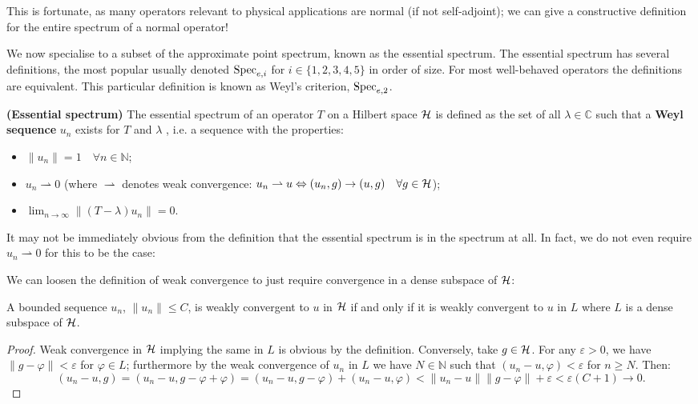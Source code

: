 \documentclass[../main.tex]{subfiles}
\begin{document}
This is fortunate, as many operators relevant to physical applications are normal (if not self-adjoint); we can give a constructive definition for the entire spectrum of a normal operator! 

We now specialise to a subset of the approximate point spectrum, known as the essential spectrum.
The essential spectrum has several definitions, 
the most popular usually denoted $\mathrm{Spec}_{e,i}$ for $i \in \{1,2,3,4,5\}$ in order of size. For 
most well-behaved operators the definitions are equivalent. This particular definition 
is known as Weyl's criterion, $\mathrm{Spec}_{e, 2}$. \cite{edmunds2018spectral}

\begin{definition}{\textbf{(Essential spectrum)}}
The essential spectrum of an operator $T$ on a Hilbert space $\mathcal{H}$ 
is defined as the set of all $\lambda \in \mathbb{C}$ such that a \textbf{Weyl sequence} $u_n$ exists for $T$ and $\lambda$ , i.e. a sequence with the properties:
\begin{itemize}
\item $\|u_n\| = 1\quad \forall n \in \mathbb{N}$;
\item $u_n \rightharpoonup 0$ (where $\rightharpoonup$ denotes weak convergence: $u_n \rightharpoonup u \Leftrightarrow (u_n, g) \rightarrow (u, g) \quad \forall g \in \mathcal{H}$);
\item $\lim_{n \rightarrow \infty}\|(T - \lambda)u_n\|  = 0$.
\end{itemize}
\end{definition}

It may not be immediately obvious from the definition that the essential spectrum is in the spectrum at all. In fact, we do not even require $u_n \rightharpoonup 0$ for this to be the case:



We can loosen the definition of weak convergence to just require convergence in a dense subspace of $\mathcal{H}$:
\begin{lemma}\label{thm:weak-conv-dense-subset}
A bounded sequence $u_n$, $\|u_n\| \leq C$, is weakly convergent to $u$ in $\mathcal{H}$ if and only if it is weakly convergent to $u$ in $L$ where $L$ is a dense subspace of $\mathcal{H}$.
\end{lemma}
\begin{proof}
Weak convergence in $\mathcal{H}$ implying the same in $L$ is obvious by the definition. 
Conversely, take $g \in \mathcal{H}$. For any $\varepsilon > 0$, we have $\|g - \varphi\| < \varepsilon$ for $\varphi \in L$; furthermore by the weak convergence of $u_n$ in $L$ we have $N \in \mathbb{N}$ such that $(u_n - u, \varphi) < \varepsilon$ for $n \geq N$. Then:
$$( u_n - u, g ) = ( u_n - u, g - \varphi + \varphi ) = ( u_n - u, g - \varphi ) + ( u_n - u, \varphi ) < \|u_n - u\| \|g - \varphi\| + \varepsilon < \varepsilon(C + 1) \rightarrow 0.$$
\end{proof}
\end{document}
